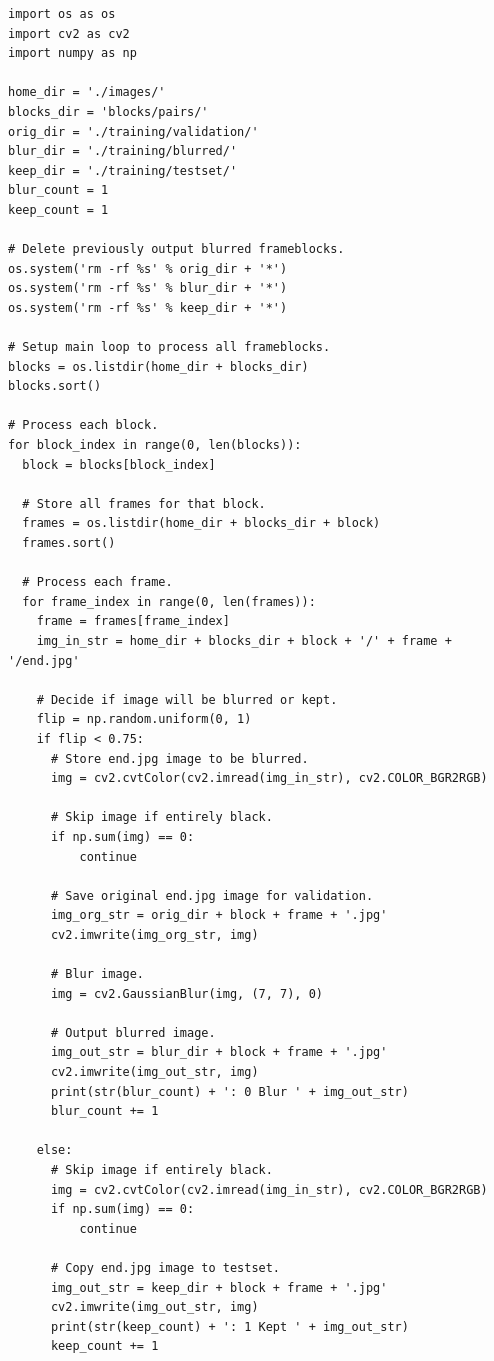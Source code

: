 \documentclass[conference]{IEEEtran}
\begin{document}
\footnotesize{
\begin{verbatim}
import os as os
import cv2 as cv2
import numpy as np

home_dir = './images/'
blocks_dir = 'blocks/pairs/'
orig_dir = './training/validation/'
blur_dir = './training/blurred/'
keep_dir = './training/testset/'
blur_count = 1
keep_count = 1

# Delete previously output blurred frameblocks.
os.system('rm -rf %s' % orig_dir + '*')
os.system('rm -rf %s' % blur_dir + '*')
os.system('rm -rf %s' % keep_dir + '*')

# Setup main loop to process all frameblocks.
blocks = os.listdir(home_dir + blocks_dir)
blocks.sort()

# Process each block.
for block_index in range(0, len(blocks)):
  block = blocks[block_index]

  # Store all frames for that block.
  frames = os.listdir(home_dir + blocks_dir + block)
  frames.sort()

  # Process each frame.
  for frame_index in range(0, len(frames)):
    frame = frames[frame_index]
    img_in_str = home_dir + blocks_dir + block + '/' + frame + '/end.jpg'

    # Decide if image will be blurred or kept.
    flip = np.random.uniform(0, 1)
    if flip < 0.75:
      # Store end.jpg image to be blurred.
      img = cv2.cvtColor(cv2.imread(img_in_str), cv2.COLOR_BGR2RGB)

      # Skip image if entirely black.
      if np.sum(img) == 0:
          continue

      # Save original end.jpg image for validation.
      img_org_str = orig_dir + block + frame + '.jpg'
      cv2.imwrite(img_org_str, img)

      # Blur image.
      img = cv2.GaussianBlur(img, (7, 7), 0)
      
      # Output blurred image.
      img_out_str = blur_dir + block + frame + '.jpg'
      cv2.imwrite(img_out_str, img)
      print(str(blur_count) + ': 0 Blur ' + img_out_str)
      blur_count += 1

    else:
      # Skip image if entirely black.
      img = cv2.cvtColor(cv2.imread(img_in_str), cv2.COLOR_BGR2RGB)
      if np.sum(img) == 0:
          continue

      # Copy end.jpg image to testset.
      img_out_str = keep_dir + block + frame + '.jpg'
      cv2.imwrite(img_out_str, img)
      print(str(keep_count) + ': 1 Kept ' + img_out_str)
      keep_count += 1
\end{verbatim}
}
\end{document}

